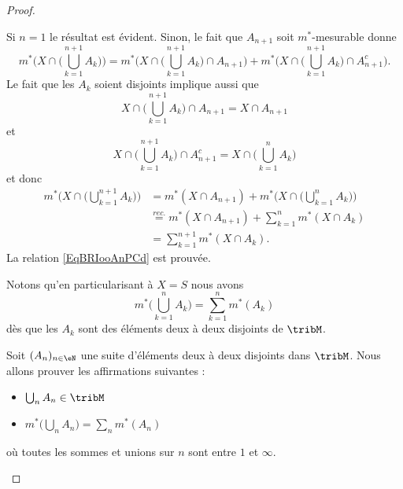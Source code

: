 \begin{proof}
\begin{subproof}
\begin{equation}
		\end{equation}
		Si \( n=1\) le résultat est évident. Sinon, le fait que \( A_{n+1}\) soit \( m^*\)-mesurable donne
		\begin{equation}
			m^*\Big( X\cap\big( \bigcup_{k=1}^{n+1}A_k \big) \Big)=m^*\Big( X\cap\big( \bigcup_{k=1}^{n+1}A_k \big)\cap A_{n+1} \Big)+m^*\Big( X\cap\big( \bigcup_{k=1}^{n+1}A_k \big)\cap A_{n+1}^c \Big).
		\end{equation}
		Le fait que les \( A_k\) soient disjoints implique aussi que
		\begin{equation}
			X\cap\big( \bigcup_{k=1}^{n+1}A_k \big)\cap A_{n+1}=X\cap A_{n+1}
		\end{equation}
		et
		\begin{equation}
			X\cap\big( \bigcup_{k=1}^{n+1}A_k \big)\cap A_{n+1}^c=X\cap\big( \bigcup_{k=1}^nA_k \big)
		\end{equation}
		et donc
		\begin{subequations}
			\begin{align}
				m^*\Big( X\cap\big( \bigcup_{k=1}^{n+1}A_k \big) \Big) & =m^*(X\cap A_{n+1})+m^*\Big( X\cap\big( \bigcup_{k=1}^nA_k \big) \Big) \\
				                                                       & \stackrel{rec.}{=}m^*(X\cap A_{n+1})+\sum_{k=1}^nm^*(X\cap A_k)        \\
				                                                       & =\sum_{k=1}^{n+1}m^*(X\cap A_k).
			\end{align}
		\end{subequations}
		La relation \eqref{EqBRIooAnPCd} est prouvée.

		Notons qu'en particularisant à \( X=S\) nous avons
		\begin{equation}
			m^*\big( \bigcup_{k=1}^nA_k \big)=\sum_{k=1}^nm^*(A_k)
		\end{equation}
		dès que les \( A_k\) sont des éléments deux à deux disjoints de \( \tribM\).

		Soit \( (A_n)_{n\in \eN}\) une suite d'éléments deux à deux disjoints dans \( \tribM\). Nous allons prouver les affirmations suivantes :
		\begin{itemize}
			\item \( \bigcup_nA_n\in\tribM\)
			\item \( m^*\big( \bigcup_nA_n \big)=\sum_nm^*(A_n)\)
		\end{itemize}
		où toutes les sommes et unions sur \( n\) sont entre \( 1\) et \( \infty\).
		\begin{subproof}


\end{subproof}
\end{subproof}
\end{proof}
